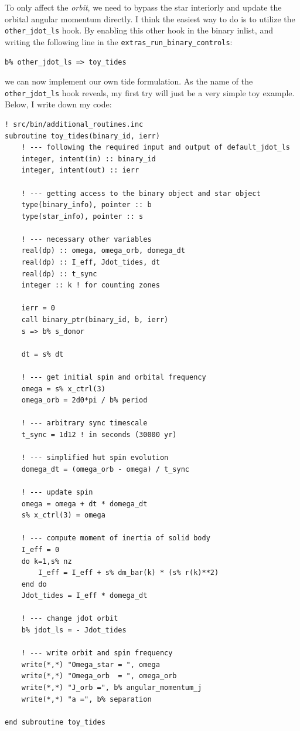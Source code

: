 \documentclass[a4paper,10pt]{article}
\begin{document}
To only affect the \emph{orbit}, we need to bypass the star interiorly and update the orbital angular momentum directly. I think the easiest way to do is to utilize the \lstinline[style=output, breaklines=true]|other_jdot_ls| hook. By enabling this other hook in the binary inlist, and writing the following line in the \lstinline[style=output, breaklines=true]|extras_run_binary_controls|:
\begin{verbatim}
b% other_jdot_ls => toy_tides
\end{verbatim}
we can now implement our own tide formulation. As the name of the \lstinline[style=output, breaklines=true]|other_jdot_ls| hook reveals, my first try will just be a very simple toy example. Below, I write down my code:
\begin{verbatim}
! src/bin/additional_routines.inc
subroutine toy_tides(binary_id, ierr)
    ! --- following the required input and output of default_jdot_ls
    integer, intent(in) :: binary_id
    integer, intent(out) :: ierr

    ! --- getting access to the binary object and star object
    type(binary_info), pointer :: b
    type(star_info), pointer :: s

    ! --- necessary other variables
    real(dp) :: omega, omega_orb, domega_dt
    real(dp) :: I_eff, Jdot_tides, dt
    real(dp) :: t_sync
    integer :: k ! for counting zones

    ierr = 0
    call binary_ptr(binary_id, b, ierr)
    s => b% s_donor 

    dt = s% dt

    ! --- get initial spin and orbital frequency
    omega = s% x_ctrl(3)
    omega_orb = 2d0*pi / b% period

    ! --- arbitrary sync timescale
    t_sync = 1d12 ! in seconds (30000 yr)

    ! --- simplified hut spin evolution
    domega_dt = (omega_orb - omega) / t_sync

    ! --- update spin
    omega = omega + dt * domega_dt
    s% x_ctrl(3) = omega 

    ! --- compute moment of inertia of solid body
    I_eff = 0
    do k=1,s% nz
        I_eff = I_eff + s% dm_bar(k) * (s% r(k)**2)
    end do
    Jdot_tides = I_eff * domega_dt

    ! --- change jdot orbit
    b% jdot_ls = - Jdot_tides

    ! --- write orbit and spin frequency
    write(*,*) "Omega_star = ", omega 
    write(*,*) "Omega_orb  = ", omega_orb
    write(*,*) "J_orb =", b% angular_momentum_j
    write(*,*) "a =", b% separation

end subroutine toy_tides
\end{verbatim}
\end{document}
